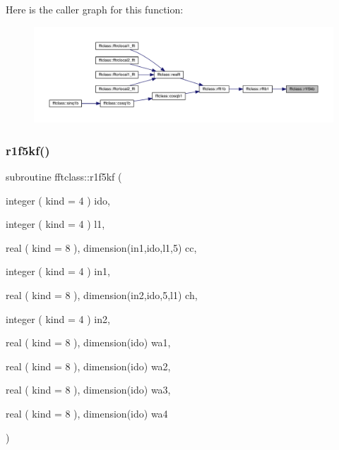 Here is the caller graph for this function\+:\nopagebreak
\begin{figure}[H]
\begin{center}
\leavevmode
\includegraphics[width=350pt]{namespacefftclass_a42f5de07f4eb994cbe15a8526291566b_icgraph}
\end{center}
\end{figure}
\mbox{\label{namespacefftclass_acc419931cfa3ec3e19e6264b35e83aae}} 
\subsubsection{\texorpdfstring{r1f5kf()}{r1f5kf()}}
{\footnotesize\ttfamily subroutine fftclass\+::r1f5kf (\begin{DoxyParamCaption}\item[{integer ( kind = 4 )}]{ido,  }\item[{integer ( kind = 4 )}]{l1,  }\item[{real ( kind = 8 ), dimension(in1,ido,l1,5)}]{cc,  }\item[{integer ( kind = 4 )}]{in1,  }\item[{real ( kind = 8 ), dimension(in2,ido,5,l1)}]{ch,  }\item[{integer ( kind = 4 )}]{in2,  }\item[{real ( kind = 8 ), dimension(ido)}]{wa1,  }\item[{real ( kind = 8 ), dimension(ido)}]{wa2,  }\item[{real ( kind = 8 ), dimension(ido)}]{wa3,  }\item[{real ( kind = 8 ), dimension(ido)}]{wa4 }\end{DoxyParamCaption})}

